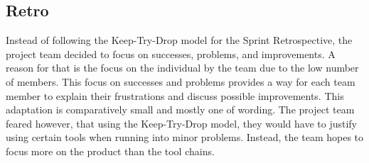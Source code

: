 \subsection{Retro}
Instead of following the Keep-Try-Drop model for the Sprint Retrospective, the project team decided to focus on successes, problems, and improvements. A reason for that is the
focus on the individual by the team due to the low number of members. This focus on successes and problems provides a way for each team member to explain their frustrations and discuss possible improvements.
This adaptation is comparatively small and mostly one of wording. The project team feared however, that using the Keep-Try-Drop model, they would have to justify using certain tools when running into minor
problems. Instead, the team hopes to focus more on the product than the tool chains.